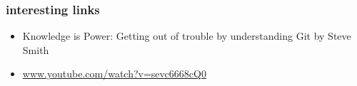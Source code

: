 \begin{frame}
	\frametitle{interesting links}

	\begin{block}{}
		\begin{itemize}
			\item Knowledge is Power: Getting out of trouble by understanding Git by Steve Smith
			\item \url{www.youtube.com/watch?v=sevc6668cQ0}
		\end{itemize}
	\end{block}
\end{frame}
